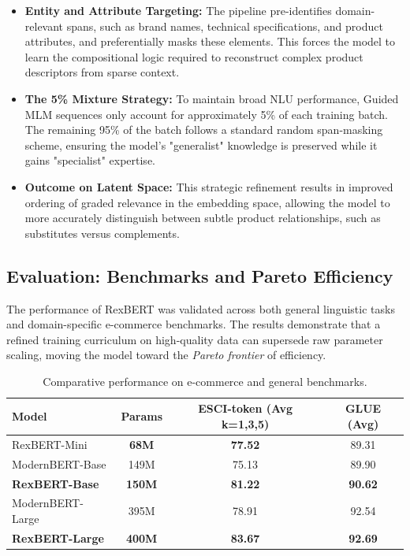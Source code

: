 \documentclass[a4paper,12pt]{article}
\begin{document}
\begin{itemize}
    \item \textbf{Entity and Attribute Targeting:} The pipeline pre-identifies domain-relevant spans, such as brand names, technical specifications, and product attributes, and preferentially masks these elements. This forces the model to learn the compositional logic required to reconstruct complex product descriptors from sparse context.
    \item \textbf{The 5\% Mixture Strategy:} To maintain broad NLU performance, Guided MLM sequences only account for approximately 5\% of each training batch. The remaining 95\% of the batch follows a standard random span-masking scheme, ensuring the model's "generalist" knowledge is preserved while it gains "specialist" expertise.
    \item \textbf{Outcome on Latent Space:} This strategic refinement results in improved ordering of graded relevance in the embedding space, allowing the model to more accurately distinguish between subtle product relationships, such as substitutes versus complements.
\end{itemize}

\subsection{Evaluation: Benchmarks and Pareto Efficiency}
The performance of RexBERT was validated across both general linguistic tasks and domain-specific e-commerce benchmarks. The results demonstrate that a refined training curriculum on high-quality data can supersede raw parameter scaling, moving the model toward the \textit{Pareto frontier} of efficiency.

\begin{table}[h]
\centering
\caption{Comparative performance on e-commerce and general benchmarks.}
\label{tab:rexbert_results}
\begin{tabular}{lccc}
\hline
\textbf{Model} & \textbf{Params} & \textbf{ESCI-token (Avg k=1,3,5)} & \textbf{GLUE (Avg)} \\ \hline
RexBERT-Mini & \textbf{68M} & \textbf{77.52}       & 89.31       \\

ModernBERT-Base & 149M           & 75.13               & 89.90                \\
\textbf{RexBERT-Base} & \textbf{150M} & \textbf{81.22}       & \textbf{90.62}       \\

ModernBERT-Large & 395M           & 78.91               & 92.54               \\
\textbf{RexBERT-Large} & \textbf{400M} & \textbf{83.67}      & \textbf{92.69}       \\ \hline
\end{tabular}
\end{table}
\end{document}
